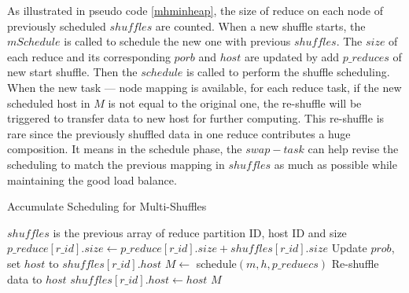As illustrated in pseudo code \ref{mhminheap}, the size of reduce on each node of previously scheduled $shuffles$ are counted. When a new shuffle starts, the $mSchedule$ is called to schedule the new one with previous $shuffles$. The $size$ of each reduce and its corresponding $porb$ and $host$ are updated by add $p\_reduces$ of new start shuffle. Then the $schedule$ is called to perform the shuffle scheduling. When the new task --- node mapping is available, for each reduce task, if the new scheduled host in $M$ is not equal to the original one, the re-shuffle will be triggered to transfer data to new host for further computing. This re-shuffle is rare since the previously shuffled data in one reduce contributes a huge composition. It means in the schedule phase, the $swap-task$ can help revise the scheduling to match the previous mapping in $shuffles$ as much as possible while maintaining the good load balance.
\begin{minipage}{\columnwidth}
\begin{algorithm}[H]
\caption{Accumulate Scheduling for Multi-Shuffles}
\label{mhminheap}
	\begin{algorithmic}[1]
	\small
		\State
		\Comment $shuffles$ is the previous array of reduce partition ID, host ID and size
		\State $p\_reduce\left[r\_id\right].size\gets p\_reduce\left[r\_id\right].size + shuffles\left[r\_id\right].size$
		\State Update $prob$, set $host$ to $shuffles\left[r\_id\right].host$
		\EndIf
		\EndFor
		\State $M\gets$ schedule$\left(m, h, p\_reduecs\right)$
				\State Re-shuffle data to $host$
				\State $shuffles\left[r\_id\right].host\gets host$
				\EndIf
			\EndFor
		\EndFor
		\Return $M$
	\EndProcedure
	\end{algorithmic}
\end{algorithm}
\end{minipage} 